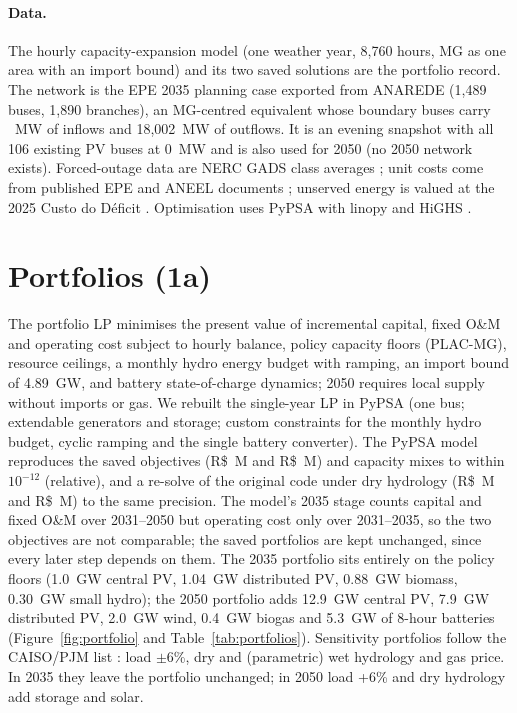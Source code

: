 \documentclass[10pt]{article}
\newcommand{\RS}{R\$}
\begin{document}
\paragraph{Data.} The hourly capacity-expansion model (one weather year, 8,760 hours, MG as one area with an import bound) and its two
saved solutions are the portfolio record. The network is the EPE 2035 planning case exported from ANAREDE (1,489 buses, 1,890 branches),
an MG-centred equivalent whose boundary buses carry \NheadroomAtwo~MW of inflows and 18,002~MW of outflows. It is an evening snapshot with
all 106 existing PV buses at 0~MW and is also used for 2050 (no 2050 network exists). Forced-outage data are NERC GADS class averages
\citep{nerc_gads_b4}; unit costs come from published EPE and ANEEL documents \citep{epe_nt047_2022,epe_nt029_2023,epe_re071_2025,aneel_bpr};
unserved energy is valued at the 2025 Custo do D\'eficit \citep{ccee2025deficit}. Optimisation uses PyPSA \citep{brown2018pypsa} with
linopy \citep{hofmann2023linopy} and HiGHS \citep{huangfu2018highs}.

\section{Portfolios (1a)}
The portfolio LP minimises the present value of incremental capital, fixed O\&M and operating cost subject to hourly balance, policy
capacity floors (PLAC-MG), resource ceilings, a monthly hydro energy budget with ramping, an import bound of 4.89~GW, and battery
state-of-charge dynamics; 2050 requires local supply without imports or gas. We rebuilt the single-year LP in PyPSA (one bus; extendable
generators and storage; custom constraints for the monthly hydro budget, cyclic ramping and the single battery converter).
The PyPSA model reproduces the saved objectives (\RS\NobjA~M and \RS\NobjB~M) and capacity mixes to within $10^{-12}$
(relative), and a re-solve of the original code under dry hydrology (\RS\NobjdryA~M and \RS\NobjdryB~M) to the same precision.
The model's 2035 stage counts capital and fixed O\&M over 2031--2050 but operating cost only over 2031--2035, so the two
objectives are not comparable; the saved portfolios are kept unchanged, since every later step depends on them.
The 2035 portfolio sits entirely on the policy floors (1.0~GW central PV, 1.04~GW distributed PV, 0.88~GW biomass, 0.30~GW small hydro);
the 2050 portfolio adds 12.9~GW central PV, 7.9~GW distributed PV, 2.0~GW wind, 0.4~GW biogas and 5.3~GW of 8-hour batteries
(Figure~\ref{fig:portfolio} and Table~\ref{tab:portfolios}). Sensitivity portfolios follow the CAISO/PJM list \citep{course_l9}: load $\pm$6\%, dry and (parametric) wet
hydrology and gas price. In 2035 they leave the portfolio unchanged; in 2050 load +6\% and dry hydrology add storage and solar.
\end{document}

